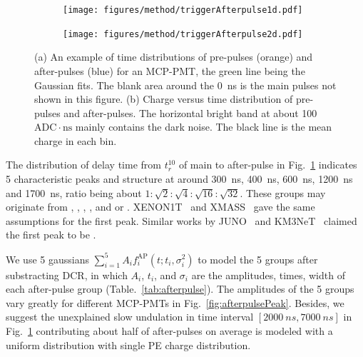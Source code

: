 \begin{figure}[!htbp]
    \centering
    \begin{subfigure}[t]{\LF\textwidth}
        \texttt{[image: figures/method/triggerAfterpulse1d.pdf]}
        \caption{}%
        \label{fig:afterpulse1d}
    \end{subfigure}
    \begin{subfigure}[t]{\LF\textwidth}
        \texttt{[image: figures/method/triggerAfterpulse2d.pdf]}
        \caption{}
        \label{fig:afterpulse2d}
    \end{subfigure}
    \caption{(a) An example of time distributions of pre-pulses (orange) and after-pulses (blue) for an MCP-PMT, the green line being the Gaussian fits. The blank area around the \SI{0}{ns} is the main pulses not shown in this figure. (b) Charge versus time distribution of pre-pulses and after-pulses. The horizontal bright band at about 100\,$\mathrm{ADC}\cdot \mathrm{ns}$ mainly contains the dark noise. The black line is the mean charge in each bin.}
\end{figure}

The distribution of delay time from $t_r^{10}$ of main to after-pulse in Fig.~\ref{fig:afterpulse1d} indicates 5 characteristic peaks and structure at around \SI{300}{ns}, \SI{400}{ns}, \SI{600}{ns}, \SI{1200}{ns} and \SI{1700}{ns}, ratio being about $1:\sqrt{2}:\sqrt{4}:\sqrt{16}:\sqrt{32}$. These groups may originate from , , , , and  or . XENON1T~\cite{XENON1TTesting} and XMASS~\cite{Abe_2020} gave the same assumptions for the first peak. Similar works by JUNO~\cite{Zhao:2022gks} and KM3NeT~\cite{KM3NetTesting} claimed the first peak to be .

We use 5 gaussians $\sum_{i=1}^{5}{A_if_i^{\mathrm{AP}}(t;t_i,\sigma_i^2)}$ to model the 5 groups after substracting DCR, in which $A_i$, $t_i$, and $\sigma_i$ are the amplitudes, times, width of each after-pulse group (Table.~\ref{tab:afterpulse}). The amplitudes of the 5 groups vary greatly for different MCP-PMTs in Fig.~\ref{fig:afterpulsePeak}. Besides, we suggest the unexplained slow undulation in time interval $[\SI{2000}{ns},\SI{7000}{ns}]$ in Fig.~\ref{fig:afterpulse1d} contributing about half of after-pulses on average is modeled with a uniform distribution with single PE charge distribution.

